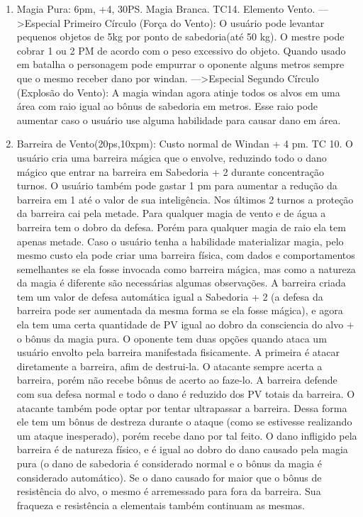 \begin{enumerate}
	\item Magia Pura: 6pm, +4, 30PS. Magia Branca. TC14. Elemento Vento.\newline
--->Especial Primeiro Círculo (Força do Vento): O usuário pode levantar pequenos objetos de 5kg por ponto de sabedoria(até 50 kg). O mestre pode cobrar 1 ou 2 PM de acordo com o peso excessivo do objeto. Quando usado em batalha o personagem pode empurrar o oponente alguns metros sempre que o mesmo receber dano por windan.
--->Especial Segundo Círculo (Explosão do Vento): A magia windan agora atinje todos os alvos em uma área com raio igual ao bônus de sabedoria em metros. Esse raio pode aumentar caso o usuário use alguma habilidade para causar dano em área.

\item Barreira de Vento(20ps,10xpm): Custo normal de Windan + 4 pm. TC 10.\newline
O usuário cria uma barreira mágica que o envolve, reduzindo todo o dano mágico que entrar na barreira em Sabedoria + 2 durante concentração turnos. O usuário também pode gastar 1 pm para aumentar a redução da barreira em 1 até o valor de sua inteligência. Nos últimos 2 turnos a proteção da barreira cai pela metade. Para qualquer magia de vento e de água a barreira tem o dobro da defesa. Porém para qualquer magia de raio ela tem apenas metade. Caso o usuário tenha a habilidade materializar magia, pelo mesmo custo ela pode criar uma barreira física, com dados e comportamentos semelhantes se ela fosse invocada como barreira mágica, mas como a natureza da magia é diferente são necessárias algumas observações. A barreira criada tem um valor de defesa automática igual a Sabedoria + 2 (a defesa da barreira pode ser aumentada da mesma forma se ela fosse mágica), e agora ela tem uma certa quantidade de PV igual ao dobro da consciencia do alvo + o bônus da magia pura. O oponente tem duas opções quando ataca um usuário envolto pela barreira manifestada fisicamente. A primeira é atacar diretamente a barreira, afim de destrui-la. O atacante sempre acerta a barreira, porém não recebe bônus de acerto ao faze-lo. A barreira defende com sua defesa normal e todo o dano é reduzido dos PV totais da barreira. O atacante também pode optar por tentar ultrapassar a barreira. Dessa forma ele tem um bônus de destreza durante o ataque (como se estivesse realizando um ataque inesperado), porém recebe dano por tal feito. O dano infligido pela barreira é de natureza físico, e é igual ao dobro do dano causado pela magia pura (o dano de sabedoria é considerado normal e o bônus da magia é considerado automático). Se o dano causado for maior que o bônus de resistência do alvo, o mesmo é arremessado para fora da barreira. Sua fraqueza e resistência a elementais também continuam as mesmas. 


\end{enumerate}
